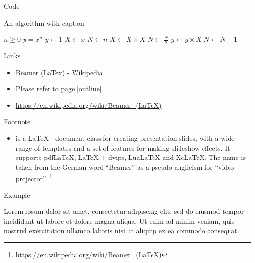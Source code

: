 \documentclass{beamer}
\begin{document}
	\begin{frame}{Code}
		\begin{algorithm}[H]
			\caption{An algorithm with caption}
			\begin{algorithmic}
				\Require $n \geq 0$
				\Ensure $y = x^n$
				\State $y \gets 1$
				\State $X \gets x$
				\State $N \gets n$
				\State $X \gets X \times X$
				\State $N \gets \frac{N}{2}$  
				\State $y \gets y \times X$
				\State $N \gets N - 1$
				\EndIf
				\EndWhile
			\end{algorithmic}
		\end{algorithm}
	\end{frame}
	
	\begin{frame}{Links}
		\begin{itemize}
			\item \href{https://en.wikipedia.org/wiki/Beamer_(LaTeX)}{Beamer (LaTex) - Wikipedia}
			\item Please refer to page \ref{outline}.
			\item \url{https://en.wikipedia.org/wiki/Beamer_(LaTeX)}
		\end{itemize}
	\end{frame}
	
	\begin{frame}{Footnote}
		\begin{itemize}
			\item {}\cite{tantau2004user} is a \LaTeX~~document\cite{kopka2003guide} class for creating presentation slides, with a wide range of templates and a set of features for making slideshow effects. It supports pdfLaTeX, LaTeX + dvips, LuaLaTeX and XeLaTeX. The name is taken from the German word ``Beamer'' as a pseudo-anglicism for ``video projector''. \footnote{\href{https://en.wikipedia.org/wiki/Beamer_(LaTeX)}{https://en.wikipedia.org/wiki/Beamer\_(LaTeX)}}
		\end{itemize}
	\end{frame}
	
	
	\begin{frame}{Example}
		\begin{example}
			Lorem ipsum dolor sit amet, consectetur adipiscing elit, sed do eiusmod tempor incididunt ut labore et dolore magna aliqua. Ut enim ad minim veniam, quis nostrud exercitation ullamco laboris nisi ut aliquip ex ea commodo consequat.
		\end{example}
	\end{frame}
	
\end{document}
